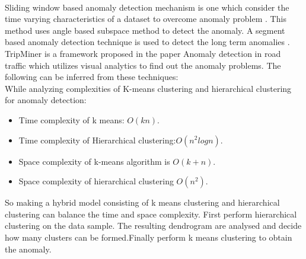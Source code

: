 \documentclass[10pt,a4paper,journal]{IEEEtran}
\begin{document}
\paragraph{}Sliding window based anomaly detection mechanism \cite{3} is one which consider the time varying characteristics of a dataset to overcome anomaly problem . This method uses angle based subspace method to detect the anomaly. A segment based anomaly detection technique \cite{4} is used to detect the long term anomalies . TripMiner is a framework proposed in the paper Anomaly detection in road traffic \cite{4} which utilizes visual analytics to find out the anomaly problems. The following can be inferred from these techniques:\\
While analyzing complexities of K-means clustering and hierarchical clustering for anomaly
detection:
\begin{itemize}
\item Time complexity of k means: $O(kn).$
\item Time complexity of Hierarchical clustering:$O(n^2logn).$
\item Space complexity of k-means algorithm is $O(k + n).$
\item Space complexity of hierarchical clustering $O(n^2).$
\end{itemize}
So making a hybrid model consisting of k means clustering and hierarchical clustering can balance the time and space complexity. First perform hierarchical clustering on the data sample.
The resulting dendrogram are analysed and decide how many clusters can be formed.Finally
perform k means clustering to obtain the anomaly.
\end{document}
